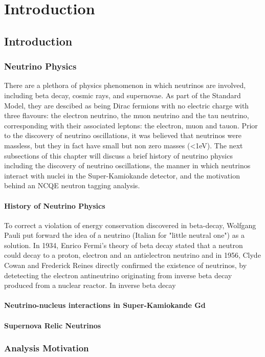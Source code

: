 \chapter{Introduction}
\label{chp:intro}

\section{Introduction}

\subsection{Neutrino Physics}

There are a plethora of physics phenomenon in which neutrinos are involved, including beta decay, cosmic rays, and supernovae. As part of the Standard Model, they are descibed as being Dirac fermions with no electric charge with three flavours: the electron neutrino, the muon neutrino and the tau neutrino, corresponding with their associated leptons: the electron, muon and tauon. Prior to the discovery of neutrino oscillations, it was believed that neutrinos were massless, but they in fact have small but non zero masses (<1eV). The next subsections of this chapter will discuss a brief history of neutrino physics including the discovery of neutrino oscillations, the manner in which neutrinos interact with nuclei in the Super-Kamiokande detector, and the motivation behind an NCQE neutron tagging analysis.

\subsubsection{History of Neutrino Physics}

To correct a violation of energy conservation discovered in beta-decay, Wolfgang Pauli put forward the idea of a neutrino (Italian for "little neutral one") as a solution. In 1934, Enrico Fermi's theory of beta decay stated that a neutron could decay to a proton, electron and an antielectron neutrino and in 1956, Clyde Cowan and Frederick Reines directly confirmed the existence of neutrinos, by detetecting the electron antineutrino originating from inverse beta decay produced from a nuclear reactor. In inverse beta decay 

\subsubsection{Neutrino-nucleus interactions in Super-Kamiokande Gd}

\subsubsection{Supernova Relic Neutrinos}

\subsection{Analysis Motivation}




